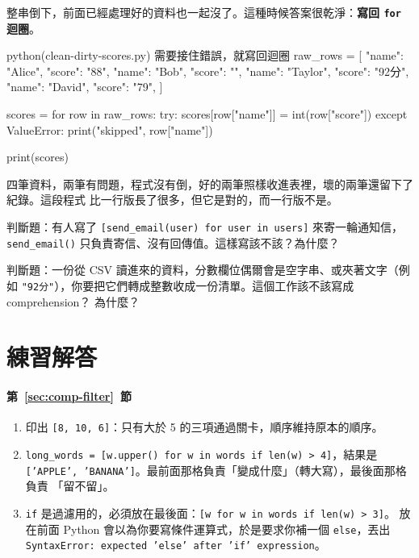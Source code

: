 整串倒下，前面已經處理好的資料也一起沒了。這種時候答案很乾淨：\textbf{寫回 \texttt{for}
迴圈}。

\begin{example}{python}{(clean-dirty-scores.py) 需要接住錯誤，就寫回迴圈}
raw_rows = [
    {"name": "Alice", "score": "88"},
    {"name": "Bob", "score": ""},
    {"name": "Taylor", "score": "92分"},
    {"name": "David", "score": "79"},
]

scores = {}
for row in raw_rows:
    try:
        scores[row["name"]] = int(row["score"])
    except ValueError:
        print("skipped", row["name"])

print(scores)
\end{example}


四筆資料，兩筆有問題，程式沒有倒，好的兩筆照樣收進表裡，壞的兩筆還留下了紀錄。這段程式
比一行版長了很多，但它是對的，而一行版不是。


\begin{drills}[label=drills:comp-limits]
\item 判斷題：有人寫了 \texttt{[send\_email(user) for user in users]} 來寄一輪通知信，
\texttt{send\_email()} 只負責寄信、沒有回傳值。這樣寫該不該？為什麼？
\item 判斷題：一份從 CSV 讀進來的資料，分數欄位偶爾會是空字串、或夾著文字（例如
\texttt{"92分"}），你要把它們轉成整數收成一份清單。這個工作該不該寫成 comprehension？
為什麼？
\end{drills}

\section*{練習解答}

\paragraph{第~\ref{sec:comp-filter}~節}
\begin{enumerate}
\item 印出 \texttt{[8, 10, 6]}：只有大於 5 的三項通過關卡，順序維持原本的順序。
\item \texttt{long\_words = [w.upper() for w in words if len(w) > 4]}，結果是
\texttt{['APPLE', 'BANANA']}。最前面那格負責「變成什麼」（轉大寫），最後面那格負責
「留不留」。
\item \texttt{if} 是過濾用的，必須放在最後面：\texttt{[w for w in words if len(w) > 3]}。
放在前面 Python 會以為你要寫條件運算式，於是要求你補一個 \texttt{else}，丟出
\texttt{SyntaxError: expected 'else' after 'if' expression}。
\end{enumerate}

